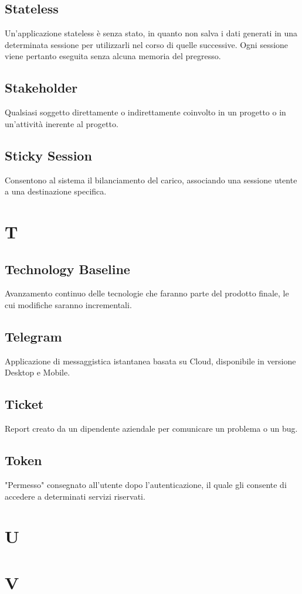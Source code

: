 \subsection{Stateless}
Un’applicazione stateless è senza stato, in quanto non salva i dati generati in una determinata sessione per utilizzarli nel corso di quelle successive. Ogni sessione viene pertanto eseguita senza alcuna memoria del pregresso.
\subsection{Stakeholder}
Qualsiasi soggetto direttamente o indirettamente coinvolto in un progetto o in un'attività inerente al progetto.
\subsection{Sticky Session}
Consentono al sistema il bilanciamento del carico, associando una sessione utente a una destinazione specifica.
\newpage
\section{T}
\subsection{Technology Baseline}
Avanzamento continuo delle tecnologie che faranno parte del prodotto finale, le cui modifiche saranno incrementali.
\subsection{Telegram}
Applicazione di messaggistica istantanea basata su Cloud, disponibile in versione Desktop e Mobile.
\subsection{Ticket}
Report creato da un dipendente aziendale per comunicare un problema o un bug.
\subsection{Token}  
"Permesso" consegnato all'utente dopo l'autenticazione, il quale gli consente di accedere a determinati servizi riservati.
\section{U}
\section{V}
